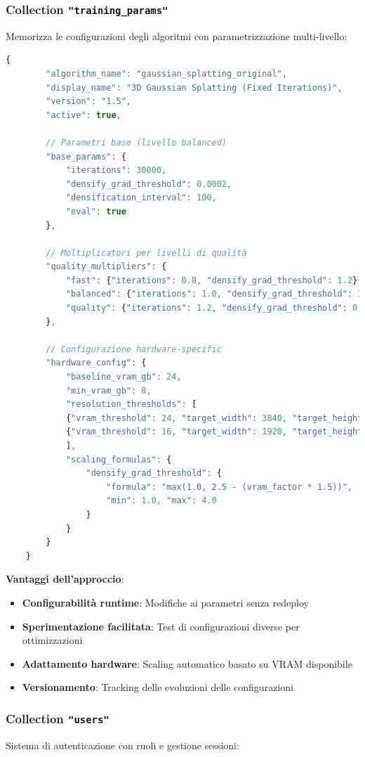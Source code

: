 \subsubsection{Collection \texttt{"training\_params"}}
Memorizza le configurazioni degli algoritmi con parametrizzazione multi-livello:

\begin{lstlisting}[language=javascript, caption=Struttura configurazione algoritmo]
	{
		"algorithm_name": "gaussian_splatting_original",
		"display_name": "3D Gaussian Splatting (Fixed Iterations)",
		"version": "1.5",
		"active": true,
		
		// Parametri base (livello balanced)
		"base_params": {
			"iterations": 30000,
			"densify_grad_threshold": 0.0002,
			"densification_interval": 100,
			"eval": true
		},
		
		// Moltiplicatori per livelli di qualità
		"quality_multipliers": {
			"fast": {"iterations": 0.8, "densify_grad_threshold": 1.2},
			"balanced": {"iterations": 1.0, "densify_grad_threshold": 1.0},
			"quality": {"iterations": 1.2, "densify_grad_threshold": 0.8}
		},
		
		// Configurazione hardware-specific
		"hardware_config": {
			"baseline_vram_gb": 24,
			"min_vram_gb": 8,
			"resolution_thresholds": [
			{"vram_threshold": 24, "target_width": 3840, "target_height": 2160},
			{"vram_threshold": 16, "target_width": 1920, "target_height": 1080}
			],
			"scaling_formulas": {
				"densify_grad_threshold": {
					"formula": "max(1.0, 2.5 - (vram_factor * 1.5))",
					"min": 1.0, "max": 4.0
				}
			}
		}
	}
\end{lstlisting}
\newpage
\textbf{Vantaggi dell'approccio}:
\begin{itemize}
	\item \textbf{Configurabilità runtime}: Modifiche ai parametri senza redeploy
	\item \textbf{Sperimentazione facilitata}: Test di configurazioni diverse per ottimizzazioni
	\item \textbf{Adattamento hardware}: Scaling automatico basato su VRAM disponibile
	\item \textbf{Versionamento}: Tracking delle evoluzioni delle configurazioni
\end{itemize}

\subsubsection{Collection \texttt{"users"}}
Sistema di autenticazione con ruoli e gestione sessioni:

